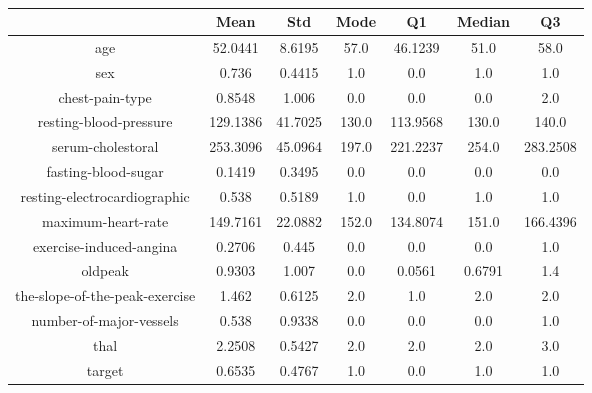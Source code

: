 \documentclass{classrep}
\begin{document}
{{{                \begin{table}[!htbp]
                    \centering
                    \begin{tabular}{|c|c|c|c|c|c|c|}
                        \hline
                        & Mean & Std & Mode & Q1 & Median & Q3 \\ \hline
                        age & 52.0441 & 8.6195 & 57.0 & 46.1239 & 51.0 & 58.0 \\ \hline
                        sex & 0.736 & 0.4415 & 1.0 & 0.0 & 1.0 & 1.0 \\ \hline
                        chest-pain-type & 0.8548 & 1.006 & 0.0 & 0.0 & 0.0 & 2.0 \\ \hline
                        resting-blood-pressure & 129.1386 & 41.7025 & 130.0 & 113.9568 & 130.0 & 140.0 \\ \hline
                        serum-cholestoral & 253.3096 & 45.0964 & 197.0 & 221.2237 & 254.0 & 283.2508 \\ \hline
                        fasting-blood-sugar & 0.1419 & 0.3495 & 0.0 & 0.0 & 0.0 & 0.0 \\ \hline
                        resting-electrocardiographic & 0.538 & 0.5189 & 1.0 & 0.0 & 1.0 & 1.0 \\ \hline
                        maximum-heart-rate & 149.7161 & 22.0882 & 152.0 & 134.8074 & 151.0 & 166.4396 \\ \hline
                        exercise-induced-angina & 0.2706 & 0.445 & 0.0 & 0.0 & 0.0 & 1.0 \\ \hline
                        oldpeak & 0.9303 & 1.007 & 0.0 & 0.0561 & 0.6791 & 1.4 \\ \hline
                        the-slope-of-the-peak-exercise & 1.462 & 0.6125 & 2.0 & 1.0 & 2.0 & 2.0 \\ \hline
                        number-of-major-vessels & 0.538 & 0.9338 & 0.0 & 0.0 & 0.0 & 1.0 \\ \hline
                        thal & 2.2508 & 0.5427 & 2.0 & 2.0 & 2.0 & 3.0 \\ \hline
                        target & 0.6535 & 0.4767 & 1.0 & 0.0 & 1.0 & 1.0 \\ \hline
                    \end{tabular}
                    \caption{}
                    \label{result_30_Regression}
                \end{table}
                \FloatBarrier

}}}
\end{document}
